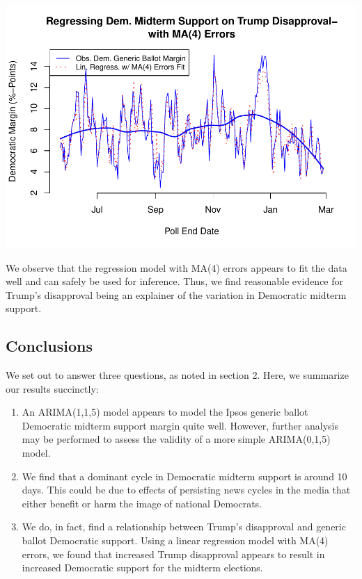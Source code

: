 \documentclass[]{article}
\begin{document}
\begin{center}\includegraphics{midterm_project_final_files/figure-latex/linreg_arma_errors_fit-1} \end{center}

We observe that the regression model with MA(4) errors appears to fit
the data well and can safely be used for inference. Thus, we find
reasonable evidence for Trump's disapproval being an explainer of the
variation in Democratic midterm support.

\subsection{Conclusions}\label{conclusions}

We set out to answer three questions, as noted in section 2. Here, we
summarize our results succinctly:

\begin{enumerate}
\def\labelenumi{\arabic{enumi}.}
\item
  An ARIMA(1,1,5) model appears to model the Ipsos generic ballot
  Democratic midterm support margin quite well. However, further
  analysis may be performed to assess the validity of a more simple
  ARIMA(0,1,5) model.
\item
  We find that a dominant cycle in Democratic midterm support is around
  10 days. This could be due to effects of persisting news cycles in the
  media that either benefit or harm the image of national Democrats.
\item
  We do, in fact, find a relationship between Trump's disapproval and
  generic ballot Democratic support. Using a linear regression model
  with MA(4) errors, we found that increased Trump disapproval appears
  to result in increased Democratic support for the midterm elections.
\end{enumerate}
\end{document}

